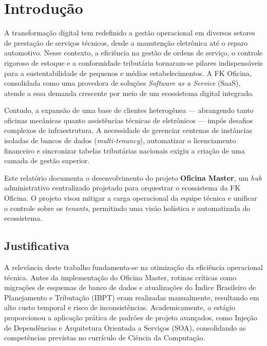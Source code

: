 
\chapter{Introdução}
\label{cap:introducao}

A transformação digital tem redefinido a gestão operacional em diversos setores de prestação de serviços técnicos, desde a manutenção eletrônica até o reparo automotivo. Nesse contexto, a eficiência na gestão de ordens de serviço, o controle rigoroso de estoque e a conformidade tributária tornaram-se pilares indispensáveis para a sustentabilidade de pequenos e médios estabelecimentos. A FK Oficina, consolidada como uma provedora de soluções \textit{Software as a Service} (SaaS), atende a essa demanda crescente por meio de um ecossistema digital integrado.

Contudo, a expansão de uma base de clientes heterogênea — abrangendo tanto oficinas mecânicas quanto assistências técnicas de eletrônicos — impôs desafios complexos de infraestrutura. A necessidade de gerenciar centenas de instâncias isoladas de bancos de dados (\textit{multi-tenancy}), automatizar o licenciamento financeiro e sincronizar tabelas tributárias nacionais exigiu a criação de uma camada de gestão superior.

Este relatório documenta o desenvolvimento do projeto \textbf{Oficina Master}, um \textit{hub} administrativo centralizado projetado para orquestrar o ecossistema da FK Oficina. O projeto visou mitigar a carga operacional da equipe técnica e unificar o controle sobre os \textit{tenants}, permitindo uma visão holística e automatizada do ecossistema.

\section{Justificativa}
\label{sec:justificativa}

A relevância deste trabalho fundamenta-se na otimização da eficiência operacional técnica. Antes da implementação do Oficina Master, rotinas críticas como migrações de esquemas de banco de dados e atualizações do Índice Brasileiro de Planejamento e Tributação (IBPT) eram realizadas manualmente, resultando em alto custo temporal e risco de inconsistências. Academicamente, o estágio proporcionou a aplicação prática de padrões de projeto avançados, como Injeção de Dependências e Arquitetura Orientada a Serviços (SOA), consolidando as competências previstas no currículo de Ciência da Computação.

